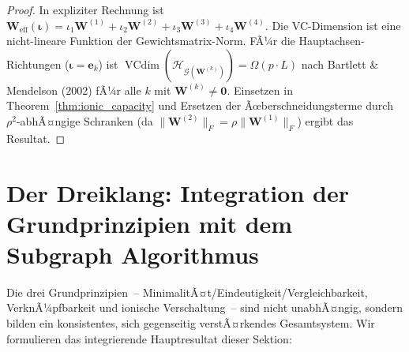 ﻿\documentclass[12pt, a4paper, openany]{report}
\newcommand{\calG}{\mathcal{G}}
\newcommand{\calH}{\mathcal{H}}
\DeclareMathOperator{\VC}{VCdim}
\begin{document}
\begin{proof}
In expliziter Rechnung ist $\bm{W}_{\mathrm{eff}}(\bm{\iota}) = \iota_1
\bm{W}^{(1)} + \iota_2 \bm{W}^{(2)} + \iota_3 \bm{W}^{(3)} + \iota_4 \bm{W}^{(4)}$.
Die VC-Dimension ist eine nicht-lineare Funktion der Gewichtsmatrix-Norm.
FÃ¼r die Hauptachsen-Richtungen ($\bm{\iota} = \bm{e}_k$) ist
$\VC(\calH_{\calG(\bm{W}^{(k)})}) = \Omega(p \cdot L)$ nach
Bartlett \& Mendelson (2002) fÃ¼r alle $k$ mit $\bm{W}^{(k)} \neq \bm{0}$.
Einsetzen in Theorem~\ref{thm:ionic_capacity} und Ersetzen der
Ãœberschneidungsterme durch $\rho^2$-abhÃ¤ngige Schranken
(da $\|\bm{W}^{(2)}\|_F = \rho \|\bm{W}^{(1)}\|_F$) ergibt das Resultat.
\end{proof}

\section{Der Dreiklang: Integration der Grundprinzipien mit dem Subgraph Algorithmus}
\label{sec:bio_integration}

Die drei Grundprinzipien~-- MinimalitÃ¤t/Eindeutigkeit/Vergleichbarkeit,
VerknÃ¼pfbarkeit und ionische Verschaltung~-- sind nicht unabhÃ¤ngig, sondern
bilden ein konsistentes, sich gegenseitig verstÃ¤rkendes Gesamtsystem.  Wir
formulieren das integrierende Hauptresultat dieser Sektion:
\end{document}
